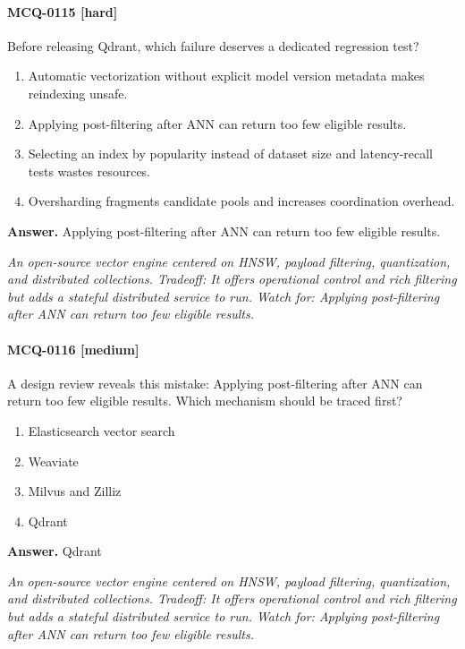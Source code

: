 \paragraph{MCQ-0115 [hard]} Before releasing Qdrant, which failure deserves a dedicated regression test?
\begin{enumerate}[label=\Alph*.]
\item Automatic vectorization without explicit model version metadata makes reindexing unsafe.
\item Applying post-filtering after ANN can return too few eligible results.
\item Selecting an index by popularity instead of dataset size and latency-recall tests wastes resources.
\item Oversharding fragments candidate pools and increases coordination overhead.
\end{enumerate}
\noindent\textbf{Answer.} Applying post-filtering after ANN can return too few eligible results.
\par\textit{An open-source vector engine centered on HNSW, payload filtering, quantization, and distributed collections. Tradeoff: It offers operational control and rich filtering but adds a stateful distributed service to run. Watch for: Applying post-filtering after ANN can return too few eligible results.}
\paragraph{MCQ-0116 [medium]} A design review reveals this mistake: Applying post-filtering after ANN can return too few eligible results. Which mechanism should be traced first?
\begin{enumerate}[label=\Alph*.]
\item Elasticsearch vector search
\item Weaviate
\item Milvus and Zilliz
\item Qdrant
\end{enumerate}
\noindent\textbf{Answer.} Qdrant
\par\textit{An open-source vector engine centered on HNSW, payload filtering, quantization, and distributed collections. Tradeoff: It offers operational control and rich filtering but adds a stateful distributed service to run. Watch for: Applying post-filtering after ANN can return too few eligible results.}

